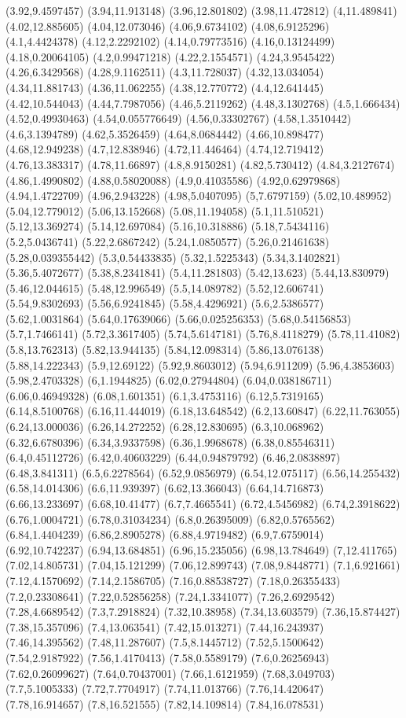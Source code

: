 (3.92,9.4597457) (3.94,11.913148) (3.96,12.801802) (3.98,11.472812) (4,11.489841) (4.02,12.885605) (4.04,12.073046) (4.06,9.6734102) (4.08,6.9125296) (4.1,4.4424378) (4.12,2.2292102) (4.14,0.79773516) (4.16,0.13124499) (4.18,0.20064105) (4.2,0.99471218) (4.22,2.1554571) (4.24,3.9545422) (4.26,6.3429568) (4.28,9.1162511) (4.3,11.728037) (4.32,13.034054) (4.34,11.881743) (4.36,11.062255) (4.38,12.770772) (4.4,12.641445) (4.42,10.544043) (4.44,7.7987056) (4.46,5.2119262) (4.48,3.1302768) (4.5,1.666434) (4.52,0.49930463) (4.54,0.055776649) (4.56,0.33302767) (4.58,1.3510442) (4.6,3.1394789) (4.62,5.3526459) (4.64,8.0684442) (4.66,10.898477) (4.68,12.949238) (4.7,12.838946) (4.72,11.446464) (4.74,12.719412) (4.76,13.383317) (4.78,11.66897) (4.8,8.9150281) (4.82,5.730412) (4.84,3.2127674) (4.86,1.4990802) (4.88,0.58020088) (4.9,0.41035586) (4.92,0.62979868) (4.94,1.4722709) (4.96,2.943228) (4.98,5.0407095) (5,7.6797159) (5.02,10.489952) (5.04,12.779012) (5.06,13.152668) (5.08,11.194058) (5.1,11.510521) (5.12,13.369274) (5.14,12.697084) (5.16,10.318886) (5.18,7.5434116) (5.2,5.0436741) (5.22,2.6867242) (5.24,1.0850577) (5.26,0.21461638) (5.28,0.039355442) (5.3,0.54433835) (5.32,1.5225343) (5.34,3.1402821) (5.36,5.4072677) (5.38,8.2341841) (5.4,11.281803) (5.42,13.623) (5.44,13.830979) (5.46,12.044615) (5.48,12.996549) (5.5,14.089782) (5.52,12.606741) (5.54,9.8302693) (5.56,6.9241845) (5.58,4.4296921) (5.6,2.5386577) (5.62,1.0031864) (5.64,0.17639066) (5.66,0.025256353) (5.68,0.54156853) (5.7,1.7466141) (5.72,3.3617405) (5.74,5.6147181) (5.76,8.4118279) (5.78,11.41082) (5.8,13.762313) (5.82,13.944135) (5.84,12.098314) (5.86,13.076138) (5.88,14.222343) (5.9,12.69122) (5.92,9.8603012) (5.94,6.911209) (5.96,4.3853603) (5.98,2.4703328) (6,1.1944825) (6.02,0.27944804) (6.04,0.038186711) (6.06,0.46949328) (6.08,1.601351) (6.1,3.4753116) (6.12,5.7319165) (6.14,8.5100768) (6.16,11.444019) (6.18,13.648542) (6.2,13.60847) (6.22,11.763055) (6.24,13.000036) (6.26,14.272252) (6.28,12.830695) (6.3,10.068962) (6.32,6.6780396) (6.34,3.9337598) (6.36,1.9968678) (6.38,0.85546311) (6.4,0.45112726) (6.42,0.40603229) (6.44,0.94879792) (6.46,2.0838897) (6.48,3.841311) (6.5,6.2278564) (6.52,9.0856979) (6.54,12.075117) (6.56,14.255432) (6.58,14.014306) (6.6,11.939397) (6.62,13.366043) (6.64,14.716873) (6.66,13.233697) (6.68,10.41477) (6.7,7.4665541) (6.72,4.5456982) (6.74,2.3918622) (6.76,1.0004721) (6.78,0.31034234) (6.8,0.26395009) (6.82,0.5765562) (6.84,1.4404239) (6.86,2.8905278) (6.88,4.9719482) (6.9,7.6759014) (6.92,10.742237) (6.94,13.684851) (6.96,15.235056) (6.98,13.784649) (7,12.411765) (7.02,14.805731) (7.04,15.121299) (7.06,12.899743) (7.08,9.8448771) (7.1,6.921661) (7.12,4.1570692) (7.14,2.1586705) (7.16,0.88538727) (7.18,0.26355433) (7.2,0.23308641) (7.22,0.52856258) (7.24,1.3341077) (7.26,2.6929542) (7.28,4.6689542) (7.3,7.2918824) (7.32,10.38958) (7.34,13.603579) (7.36,15.874427) (7.38,15.357096) (7.4,13.063541) (7.42,15.013271) (7.44,16.243937) (7.46,14.395562) (7.48,11.287607) (7.5,8.1445712) (7.52,5.1500642) (7.54,2.9187922) (7.56,1.4170413) (7.58,0.5589179) (7.6,0.26256943) (7.62,0.26099627) (7.64,0.70437001) (7.66,1.6121959) (7.68,3.049703) (7.7,5.1005333) (7.72,7.7704917) (7.74,11.013766) (7.76,14.420647) (7.78,16.914657) (7.8,16.521555) (7.82,14.109814) (7.84,16.078531) 